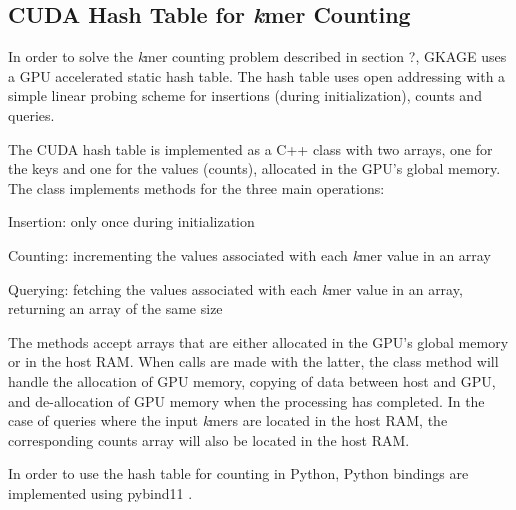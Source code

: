 \subsection{CUDA Hash Table for \textit{k}mer Counting}
In order to solve the \textit{k}mer counting problem described in section ?, GKAGE uses a GPU accelerated static hash table.
The hash table uses open addressing with a simple linear probing scheme for insertions (during initialization), counts and queries.

The CUDA hash table is implemented as a C++ class with two arrays, one for the keys and one for the values (counts), allocated in the GPU's global memory.
The class implements methods for the three main operations:
\begin{compactenum}
  \item
    Insertion: only once during initialization
  \item
    Counting: incrementing the values associated with each \textit{k}mer value in an array
  \item
    Querying: fetching the values associated with each \textit{k}mer value in an array, returning an array of the same size
\end{compactenum}

The methods accept arrays that are either allocated in the GPU's global memory or in the host RAM.
When calls are made with the latter, the class method will handle the allocation of GPU memory, copying of data between host and GPU, and de-allocation of GPU memory when the processing has completed.
In the case of queries where the input \textit{k}mers are located in the host RAM, the corresponding counts array will also be located in the host RAM.

In order to use the hash table for counting in Python, Python bindings are implemented using pybind11 \cite{pybind11}.



